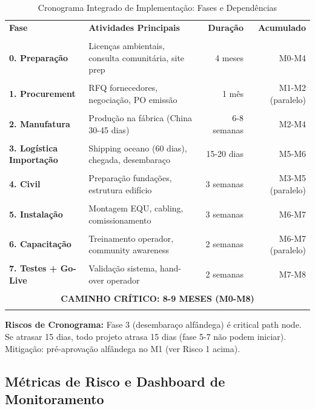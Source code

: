 \documentclass[12pt, a4paper]{article}
\begin{document}
\begin{table}[H]
\centering
\caption{Cronograma Integrado de Implementação: Fases e Dependências}
\label{tab:timeline}
\small
\begin{tabular}{|l|l|r|r|}
\hline\textbf{Fase} &\textbf{Atividades Principais} &\textbf{Duração} &\textbf{Acumulado} \\\\
\hline\textbf{0. Preparação} & Licenças ambientais, consulta comunitária, site prep & 4 meses & M0-M4 \\\\
\hline\textbf{1. Procurement} & RFQ fornecedores, negociação, PO emissão & 1 mês & M1-M2 (paralelo) \\\\
\hline\textbf{2. Manufatura} & Produção na fábrica (China 30-45 dias) & 6-8 semanas & M2-M4 \\\\
\hline\textbf{3. Logística Importação} & Shipping oceano (60 dias), chegada, desembaraço & 15-20 dias & M5-M6 \\\\
\hline\textbf{4. Civil} & Preparação fundações, estrutura edifício & 3 semanas & M3-M5 (paralelo) \\\\
\hline\textbf{5. Instalação} & Montagem EQU, cabling, comissionamento & 3 semanas & M6-M7 \\\\
\hline\textbf{6. Capacitação} & Treinamento operador, community awareness & 2 semanas & M6-M7 (paralelo) \\\\
\hline\textbf{7. Testes + Go-Live} & Validação sistema, hand-over operador & 2 semanas & M7-M8 \\\\
\hline
\multicolumn{4}{|c|}{\textbf{CAMINHO CRÍTICO: 8-9 MESES (M0-M8)}} \\\\
\hline
\end{tabular}
\end{table}\textbf{Riscos de Cronograma:} Fase 3 (desembaraço alfândega) é critical path node. Se atrasar 15 dias, todo projeto atrasa 15 dias (fase 5-7 não podem iniciar). Mitigação: pré-aprovação alfândega no M1 (ver Risco 1 acima).

\subsection{Métricas de Risco e Dashboard de Monitoramento}
\end{document}
